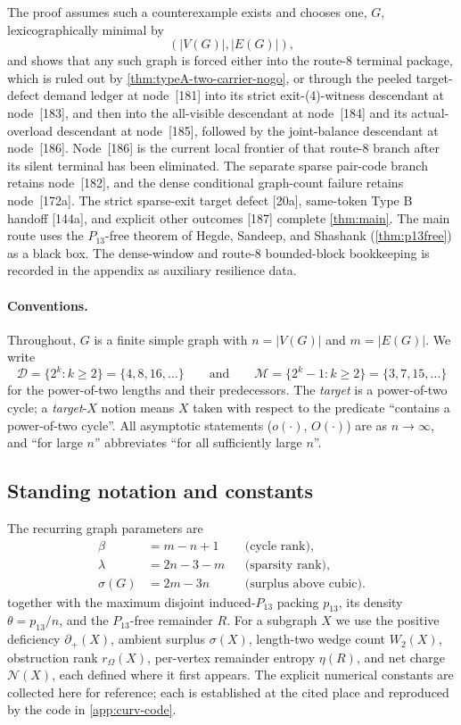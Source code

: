 \documentclass[11pt]{article}
\newcommand{\Mers}{\mathcal M}
\newcommand{\Pow}{\mathcal D}
\newcommand{\defp}{\partial_+}
\newcommand{\No}{\mathcal N}
\begin{document}
The proof assumes such a counterexample exists and chooses one, $G$,
lexicographically minimal by
\[
(|V(G)|,|E(G)|),
\]
and shows that any such graph is forced either into the route-8 terminal
package, which is ruled out by \cref{thm:typeA-two-carrier-nogo}, or through
the peeled target-defect demand ledger at node~[181] into its strict
exit-\textup{(4)}-witness descendant at node~[183], and then into the
all-visible descendant at node~[184] and its actual-overload descendant at
node~[185], followed by the joint-balance descendant at node~[186].
Node~[186] is the current
local frontier of that route-8 branch after its silent terminal has been eliminated.  The separate sparse pair-code branch
retains node~[182], and the dense conditional graph-count failure retains
node~[172a].  The strict sparse-exit target defect [20a], same-token
Type B handoff [144a], and explicit other outcomes [187] complete
\cref{thm:main}.
The main route uses the $P_{13}$-free theorem of
Hegde, Sandeep, and Shashank (\cref{thm:p13free}) as a black box.  The
dense-window and route-8 bounded-block bookkeeping is recorded in the appendix as
auxiliary resilience data.

\paragraph{Conventions.}
Throughout, $G$ is a finite simple graph with $n=|V(G)|$ and $m=|E(G)|$.  We write
\[
\Pow=\{2^{k}:k\ge2\}=\{4,8,16,\dots\}
\qquad\text{and}\qquad
\Mers=\{2^{k}-1:k\ge2\}=\{3,7,15,\dots\}
\]
for the power-of-two lengths and their predecessors.  The \emph{target} is a power-of-two cycle; a \emph{target}-$X$ notion means $X$ taken with respect to the predicate ``contains a power-of-two cycle''.  All asymptotic statements ($o(\cdot)$, $O(\cdot)$) are as $n\to\infty$, and ``for large $n$'' abbreviates ``for all sufficiently large $n$''.

\subsection*{Standing notation and constants}

The recurring graph parameters are
\[
\begin{aligned}
\beta&=m-n+1 &&\text{(cycle rank)},\\
\lambda&=2n-3-m &&\text{(sparsity rank)},\\
\sigma(G)&=2m-3n &&\text{(surplus above cubic)} .
\end{aligned}
\]
together with the maximum disjoint induced-$P_{13}$ packing $p_{13}$, its density $\theta=p_{13}/n$, and the $P_{13}$-free remainder $R$.  For a subgraph $X$ we use the positive deficiency $\defp(X)$, ambient surplus $\sigma(X)$, length-two wedge count $W_2(X)$, obstruction rank $r_\Omega(X)$, per-vertex remainder entropy $\eta(R)$, and net charge $\No(X)$, each defined where it first appears.  The explicit numerical constants are collected here for reference; each is established at the cited place and reproduced by the code in \cref{app:curv-code}.
\end{document}

